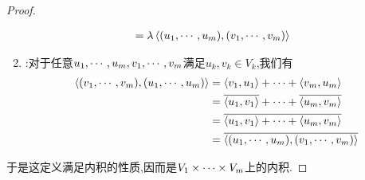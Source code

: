 \documentclass{ctexart}
\begin{document}
\begin{proof}
\begin{enumerate}[label=\tbf{(\arabic*)}]
\[\begin{aligned}
                &= \lambda\left\langle{({u}_1,\cdots,{u}_{m})},{({v}_1,\cdots,{v}_{m})}\right\rangle
            \end{aligned}\]
        \item {}:对于任意${u}_1,\cdots,{u}_{m},{v}_1,\cdots,{v}_{m}$满足$u_k,v_k\in V_k$,我们有
            \[\begin{aligned}
                \left\langle{({v}_1,\cdots,{v}_{m})},{({u}_1,\cdots,{u}_{m})}\right\rangle
                &= \left\langle{v_1},{u_1}\right\rangle+\cdots+\left\langle{v_m},{u_m}\right\rangle \\
                &= \overline{\left\langle{u_1},{v_1}\right\rangle}+\cdots+\overline{\left\langle{u_m},{v_m}\right\rangle} \\
                &= \overline{\left\langle{u_1},{v_1}\right\rangle+\cdots+\left\langle{u_m},{v_m}\right\rangle} \\
                &= \overline{\left\langle{({u}_1,\cdots,{u}_{m})},{({v}_1,\cdots,{v}_{m})}\right\rangle}
            \end{aligned}\]
    \end{enumerate}
    于是这定义满足内积的性质,因而是${V}_1\times\cdots\times{V}_{m}$上的内积.
\end{proof}
\end{document}
